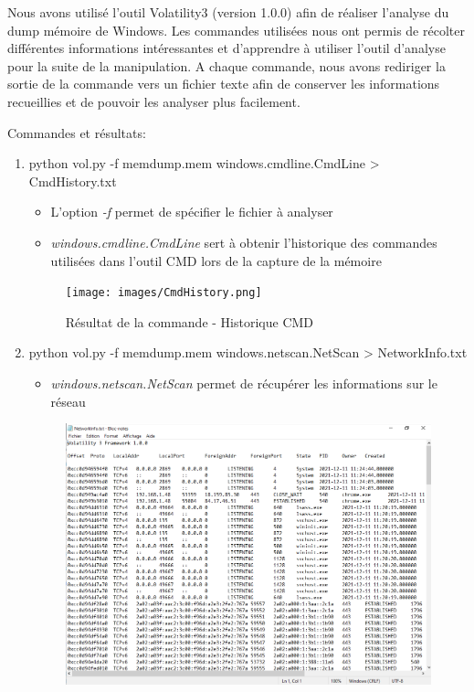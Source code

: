 \documentclass[a4paper]{article}
\begin{document}
Nous avons utilisé l'outil Volatility3 (version 1.0.0) afin de réaliser l'analyse du dump mémoire de Windows. Les commandes utilisées nous ont permis de récolter différentes informations intéressantes et d'apprendre à utiliser l'outil d'analyse pour la suite de la manipulation. A chaque commande, nous avons rediriger la sortie de la commande vers un fichier texte afin de conserver les informations recueillies et de pouvoir les analyser plus facilement.

Commandes et résultats:
\begin{enumerate}
    \item python vol.py -f memdump.mem windows.cmdline.CmdLine > CmdHistory.txt
    \begin{itemize}
        \item L'option \textit{-f} permet de spécifier le fichier à analyser
        \item \textit{windows.cmdline.CmdLine} sert à obtenir l'historique des commandes utilisées dans l'outil CMD lors de la capture de la mémoire
    \end{itemize}
    \begin{figure}[H]
        \centering
        \texttt{[image: images/CmdHistory.png]}
        \caption{Résultat de la commande - Historique CMD}
        \label{cmdhistory}
    \end{figure}
    \item python vol.py -f memdump.mem windows.netscan.NetScan > NetworkInfo.txt
    \begin{itemize}
        \item \textit{windows.netscan.NetScan} permet de récupérer les informations sur le réseau
    \end{itemize}
    \begin{figure}[H]
        \centering
        \includegraphics[width=15cm]{images/NetworkInfo.png}

\end{figure}
\end{enumerate}
\end{document}
